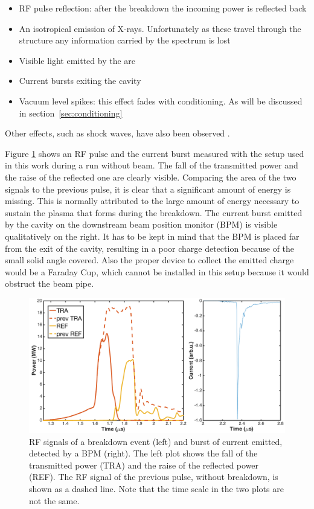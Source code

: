 \begin{itemize}
\item RF pulse reflection: after the breakdown the incoming power is reflected back
\item An isotropical emission of X-rays. Unfortunately as these travel through the structure any information carried by the spectrum is lost
\item Visible light emitted by the arc
\item Current bursts exiting the cavity
\item Vacuum level spikes: this effect fades with conditioning. As will be discussed in section~\ref{sec:conditioning} 
\end{itemize}
Other effects, such as shock waves, have also been observed \cite{Rajamaki:2143815}. 

Figure \ref{RFandBPM} shows an RF pulse and the current burst measured with the setup used in this work during a run without beam. The fall of the transmitted power and the raise of the reflected one are clearly visible. Comparing the area of the two signals to the previous pulse, it is clear that a significant amount of energy is missing. This is normally attributed to the large amount of energy necessary to sustain the plasma that forms during the breakdown. The current burst emitted by the cavity on the downstream beam position monitor (BPM) is visible qualitatively on the right. It has to be kept in mind that the BPM is placed far from the exit of the cavity, resulting in a poor charge detection because of the small solid angle covered. Also the proper device to collect the emitted charge would be a Faraday Cup, which cannot be installed in this setup because it would obstruct the beam pipe. 


\begin{figure}[h]
\centering
\includegraphics[scale=0.33]{pictures/RFandBPM.png}
\caption{RF signals of a breakdown event (left) and burst of current emitted, detected by a BPM (right). The left plot shows the fall of the transmitted power (TRA) and the raise of the reflected power (REF). The RF signal of the previous pulse, without breakdown, is shown as a dashed line. Note that the time scale in the two plots are not the same.}
\label{RFandBPM}
\end{figure}




